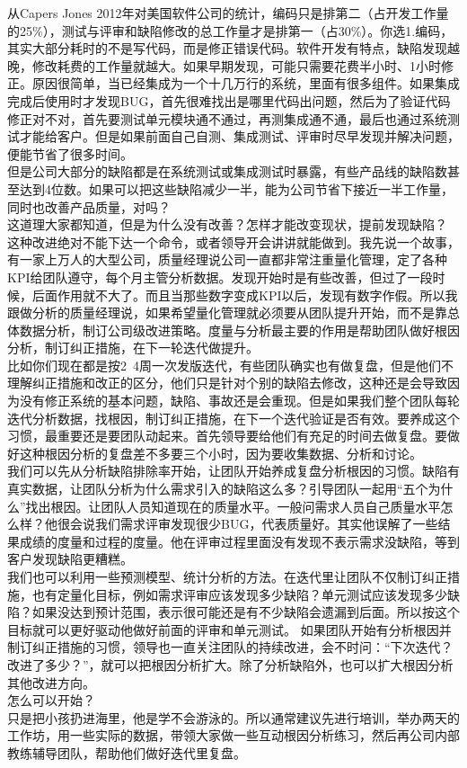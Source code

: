 {\begin{minipage}[t]{0.97\columnwidth}
从Capers Jones
2012年对美国软件公司的统计，编码只是排第二（占开发工作量的25\%），测试与评审和缺陷修改的总工作量才是排第一（占30\%）。你选1.编码，其实大部分耗时的不是写代码，而是修正错误代码。软件开发有特点，缺陷发现越晚，修改耗费的工作量就越大。如果早期发现，可能只需要花费半小时、1小时修正。原因很简单，当已经集成为一个十几万行的系统，里面有很多组件。如果集成完成后使用时才发现BUG，首先很难找出是哪里代码出问题，然后为了验证代码修正对不对，首先要测试单元模块通不通过，再测集成通不通，最后也通过系统测试才能给客户。但是如果前面自己自测、集成测试、评审时尽早发现并解决问题，便能节省了很多时间。\\
但是公司大部分的缺陷都是在系统测试或集成测试时暴露，有些产品线的缺陷数甚至达到4位数。如果可以把这些缺陷减少一半，能为公司节省下接近一半工作量，同时也改善产品质量，对吗？\\
这道理大家都知道，但是为什么没有改善？怎样才能改变现状，提前发现缺陷？\\
这种改进绝对不能下达一个命令，或者领导开会讲讲就能做到。我先说一个故事，有一家上万人的大型公司，质量经理说公司一直都非常注重量化管理，定了各种KPI给团队遵守，每个月主管分析数据。发现开始时是有些改善，但过了一段时候，后面作用就不大了。而且当那些数字变成KPI以后，发现有数字作假。所以我跟做分析的质量经理说，如果希望量化管理就必须要从团队提升开始，而不是靠总体数据分析，制订公司级改进策略。度量与分析最主要的作用是帮助团队做好根因分析，制订纠正措施，在下一轮迭代做提升。\\
比如你们现在都是按2~4周一次发版迭代，有些团队确实也有做复盘，但是他们不理解纠正措施和改正的区分，他们只是针对个别的缺陷去修改，这种还是会导致因为没有修正系统的基本问题，缺陷、事故还是会重现。但是如果我们整个团队每轮迭代分析数据，找根因，制订纠正措施，在下一个迭代验证是否有效。要养成这个习惯，最重要还是要团队动起来。首先领导要给他们有充足的时间去做复盘。要做好这种根因分析的复盘差不多要三个小时，因为要收集数据、分析和讨论。\\
我们可以先从分析缺陷排除率开始，让团队开始养成复盘分析根因的习惯。缺陷有真实数据，让团队分析为什么需求引入的缺陷这么多？引导团队一起用``五个为什么''找出根因。让团队人员知道现在的质量水平。一般问需求人员自己质量水平怎么样？他很会说我们需求评审发现很少BUG，代表质量好。其实他误解了一些结果成绩的度量和过程的度量。他在评审过程里面没有发现不表示需求没缺陷，等到客户发现缺陷更糟糕。\\
我们也可以利用一些预测模型、统计分析的方法。在迭代里让团队不仅制订纠正措施，也有定量化目标，例如需求评审应该发现多少缺陷？单元测试应该发现多少缺陷？如果没达到预计范围，表示很可能还是有不少缺陷会遗漏到后面。所以按这个目标就可以更好驱动他做好前面的评审和单元测试。
如果团队开始有分析根因并制订纠正措施的习惯，领导也一直关注团队的持续改进，会不时问：“下次迭代？改进了多少？”，就可以把根因分析扩大。除了分析缺陷外，也可以扩大根因分析其他改进方向。\\
怎么可以开始？\\
只是把小孩扔进海里，他是学不会游泳的。所以通常建议先进行培训，举办两天的工作坊，用一些实际的数据，带领大家做一些互动根因分析练习，然后再公司内部教练辅导团队，帮助他们做好迭代里复盘。\\
\strut
\end{minipage}}

